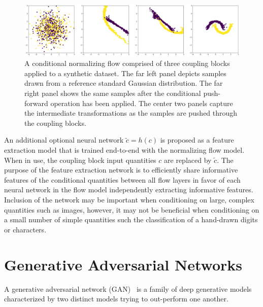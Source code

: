 \begin{figure}[htbp]
    \caption[Illustration of conditional normalizing flows density estimation on synthetic data]{
        A conditional normalizing flow comprised of three coupling blocks applied to a synthetic dataset.
        The far left panel depicts samples drawn from a reference standard Gaussian distribution.
        The far right panel shows the same samples after the conditional push-forward operation has been applied.
        The center two panels capture the intermediate transformations as the samples are pushed through the coupling blocks.
    }
    \begin{center}
        \setlength{\fboxsep}{0pt}%
        \setlength{\fboxrule}{1pt}%
        \includegraphics[width=150mm]{figs/two_moons_flow}
    \end{center}
    \label{fig:moon_flows}
\end{figure}

An additional optional neural network $\tilde{c} = h(c)$ is proposed as a feature extraction model that is trained
end-to-end with the normalizing flow model.
When in use, the coupling block input quantities $c$ are replaced by $\tilde{c}$.
The purpose of the feature extraction network is to efficiently share informative features of the
conditional quantities between all flow layers in favor of each neural network in the flow model independently
extracting informative features.
Inclusion of the network may be important when conditioning on large, complex quantities such as images, however, it
may not be beneficial when conditioning on a small number of simple quantities such the classification of a hand-drawn
digits or characters.

\section{Generative Adversarial Networks}\label{sec:generative-adversarial-networks}

A generative adversarial network (GAN)~\cite{gan_goodfellow} is a family of deep generative models characterized by two
distinct models trying to out-perform one another.


